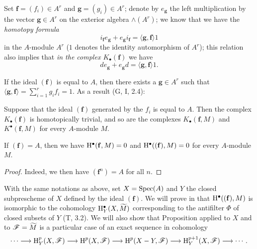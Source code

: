 \begin{env}[1.1.7]
\label{III.1.1.7}
Set $\mathbf{f}=(f_i)\in A^r$ and $\mathbf{g}=(g_i)\in A^r$; denote by $e_\mathbf{g}$ the left multiplication by the vector $\mathbf{g}\in A^r$ on the exterior algebra $\wedge(A^r)$; we know that we have the \emph{homotopy formula}
\[
  i_\mathbf{f}e_\mathbf{g}+e_\mathbf{g}i_\mathbf{f}=\langle\mathbf{g},\mathbf{f}\rangle 1
  \tag{1.1.7.1}
\]
in the $A$-module $A^r$ ($1$ denotes the identity automorphism of $A^r$); this relation also implies that \emph{in the complex $K_\bullet(\mathbf{f})$} we have
\[
  de_\mathbf{g}+e_\mathbf{g}d=\langle\mathbf{g},\mathbf{f}\rangle 1.
  \tag{1.1.7.2}
\]

If the ideal $(\mathbf{f})$ is equal to $A$, then there exists a $\mathbf{g}\in A^r$ such that $\langle\mathbf{g},\mathbf{f}\rangle=\sum_{i=1}^r g_i f_i=1$.
As a result (G, I, 2.4):
\end{env}

\begin{proposition}[1.1.8]
\label{III.1.1.8}
Suppose that the ideal $(\mathbf{f})$ generated by the $f_i$ is equal to $A$.
Then the complex $K_\bullet(\mathbf{f})$ is homotopically trivial, and so are the complexes $K_\bullet(\mathbf{f},M)$ and $K^\bullet(\mathbf{f},M)$ for every $A$-module $M$.
\end{proposition}

\begin{corollary}[1.1.9]
\label{III.1.1.9}
If $(\mathbf{f})=A$, then we have $\mathrm{H}^\bullet(\mathbf{f},M)=0$ and $\mathrm{H}^\bullet((\mathbf{f}),M)=0$ for every $A$-module $M$.
\end{corollary}

\begin{proof}
\label{proof-III.1.1.9}
Indeed, we then have $(\mathbf{f}^n)=A$ for all $n$.
\end{proof}

\begin{remark}[1.1.10]
\label{III.1.1.10}
With the same notations as above, set $X=\operatorname{Spec}(A)$ and $Y$ the closed subprescheme of $X$ defined by the ideal $(\mathbf{f})$.
We will prove in  that $\mathrm{H}^\bullet((\mathbf{f}),M)$ is isomorphic to the cohomology $\mathrm{H}_Y^\bullet(X,\widetilde{M})$ corresponding to the antifilter $\Phi$ of closed subsets of $Y$ (T, 3.2).
We will also show that Proposition  applied to $X$ and to $\mathscr{F}=\widetilde{M}$ is a particular case of an exact sequence in cohomology
\[
  \cdots\to\HH_Y^p(X,\sh{F})\to\HH^p(X,\sh{F})\to\HH^p(X\setmin Y,\sh{F})\to\HH_Y^{p+1}(X,\sh{F})\to\cdots.
\]
\end{remark}

